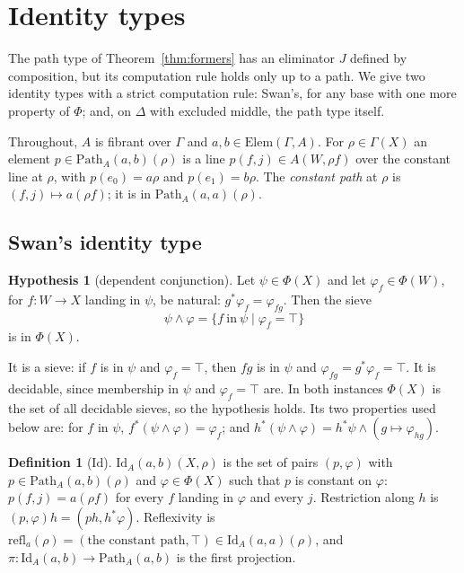 \documentclass[11pt]{article}
\newcommand{\Elem}{\mathrm{Elem}}
\newcommand{\Path}{\mathrm{Path}}
\newcommand{\Id}{\mathrm{Id}}
\theoremstyle{plain}
\theoremstyle{definition}
\newtheorem{definition}[theorem]{Definition}
\newtheorem{hypothesis}[theorem]{Hypothesis}
\theoremstyle{remark}
\begin{document}
\section{Identity types}\label{sec:id}

The path type of Theorem~\ref{thm:formers} has an eliminator $J$ defined
by composition, but its computation rule holds only up to a path. We give
two identity types with a strict computation rule: Swan's, for any base
with one more property of $\Phi$; and, on $\Delta$ with excluded middle,
the path type itself.

Throughout, $A$ is fibrant over $\Gamma$ and $a,b\in\Elem(\Gamma,A)$. For
$\rho\in\Gamma(X)$ an element $p\in\Path_A(a,b)(\rho)$ is a line
$p(f,j)\in A(W,\rho f)$ over the constant line at $\rho$, with
$p(e_0)=a\rho$ and $p(e_1)=b\rho$. The \emph{constant path} at $\rho$ is
$(f,j)\mapsto a(\rho f)$; it is in $\Path_A(a,a)(\rho)$.

\subsection{Swan's identity type}

\begin{hypothesis}[dependent conjunction]\label{hyp:dc}
Let $\psi\in\Phi(X)$ and let $\varphi_f\in\Phi(W)$, for $f:W\to X$
landing in $\psi$, be natural: $g^*\varphi_f=\varphi_{fg}$. Then the
sieve
\[
\psi\wedge\varphi=\{f\ \text{in}\ \psi\mid \varphi_f=\top\}
\]
is in $\Phi(X)$.
\end{hypothesis}

It is a sieve: if $f$ is in $\psi$ and $\varphi_f=\top$, then $fg$ is in
$\psi$ and $\varphi_{fg}=g^*\varphi_f=\top$. It is decidable, since
membership in $\psi$ and $\varphi_f=\top$ are. In both instances $\Phi(X)$
is the set of all decidable sieves, so the hypothesis holds. Its two
properties used below are: for $f$ in $\psi$,
$f^*(\psi\wedge\varphi)=\varphi_f$; and
$h^*(\psi\wedge\varphi)=h^*\psi\wedge(g\mapsto\varphi_{hg})$.

\begin{definition}[$\Id$]\label{def:id}
$\Id_A(a,b)(X,\rho)$ is the set of pairs $(p,\varphi)$ with
$p\in\Path_A(a,b)(\rho)$ and $\varphi\in\Phi(X)$ such that $p$ is
constant on $\varphi$: $p(f,j)=a(\rho f)$ for every $f$ landing in
$\varphi$ and every $j$. Restriction along $h$ is
$(p,\varphi)h=(ph,h^*\varphi)$. Reflexivity is
$\mathrm{refl}_a(\rho)=(\text{the constant path},\top)\in\Id_A(a,a)(\rho)$,
and $\pi:\Id_A(a,b)\to\Path_A(a,b)$ is the first projection.
\end{definition}
\end{document}
